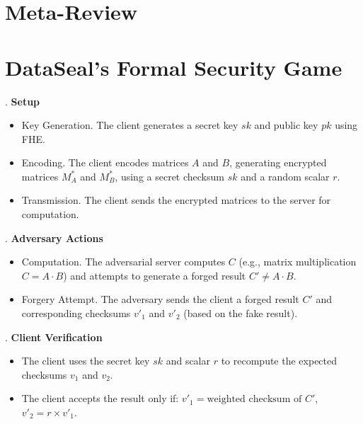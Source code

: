 \newpage

\appendices



\section{Meta-Review}



\section{DataSeal's Formal Security Game}

. \textbf{Setup}

\begin{itemize}
    \setlength{\leftmargini}{0pt}
    \item Key Generation. The client generates a secret key $sk$ and public key $pk$ using FHE.
    \item Encoding. The client encodes matrices \( A \) and \( B \), generating encrypted matrices \( M^*_A \) and \( M^*_B \), using a secret checksum \( sk \) and a random scalar \( r \).
    \item Transmission. The client sends the encrypted matrices to the server for computation.
\end{itemize}




. \textbf{Adversary Actions}
\begin{itemize}
    \setlength{\leftmargini}{0pt}
    \item Computation. The adversarial server computes \( C \) (e.g., matrix multiplication \( C = A \cdot B \)) and attempts to generate a forged result \( C' \neq A \cdot B \).
    \item Forgery Attempt. The adversary sends the client a forged result \( C' \) and corresponding checksums \( v'_1 \) and \( v'_2 \) (based on the fake result).
\end{itemize}

. \textbf{Client Verification}
\begin{itemize}
    \setlength{\leftmargini}{0pt}
    \item The client uses the secret key \( sk \) and scalar \( r \) to recompute the expected checksums \( v_1 \) and \( v_2 \).
    \item The client accepts the result only if: \( v'_1 = \text{weighted checksum of } C' \), \( v'_2 = r \times v'_1 \).
\end{itemize}

